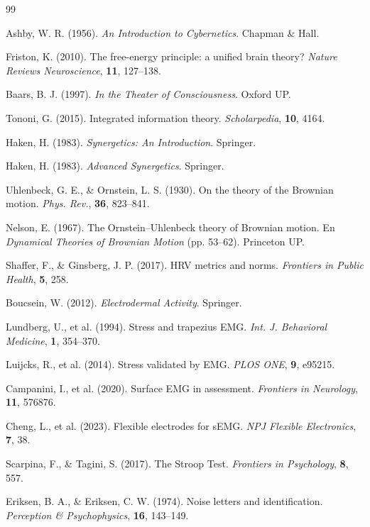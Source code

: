 \documentclass[10pt,a4paper,twocolumn]{article}
\theoremstyle{definition}
\theoremstyle{plain}
\begin{document}
\begin{thebibliography}{99}\small

Ashby, W. R. (1956). \emph{An Introduction to Cybernetics}. Chapman \& Hall.

Friston, K. (2010). The free-energy principle: a unified brain theory?
\emph{Nature Reviews Neuroscience}, \textbf{11}, 127–138.

Baars, B. J. (1997). \emph{In the Theater of Consciousness}. Oxford UP.

Tononi, G. (2015). Integrated information theory. \emph{Scholarpedia}, \textbf{10}, 4164.

Haken, H. (1983). \emph{Synergetics: An Introduction}. Springer.

Haken, H. (1983). \emph{Advanced Synergetics}. Springer.

Uhlenbeck, G. E., \& Ornstein, L. S. (1930). On the theory of the Brownian motion.
\emph{Phys. Rev.}, \textbf{36}, 823–841.

Nelson, E. (1967). The Ornstein–Uhlenbeck theory of Brownian motion.
En \emph{Dynamical Theories of Brownian Motion} (pp. 53–62). Princeton UP.

Shaffer, F., \& Ginsberg, J. P. (2017). HRV metrics and norms.
\emph{Frontiers in Public Health}, \textbf{5}, 258.

Boucsein, W. (2012). \emph{Electrodermal Activity}. Springer.

Lundberg, U., et al. (1994). Stress and trapezius EMG.
\emph{Int. J. Behavioral Medicine}, \textbf{1}, 354–370.

Luijcks, R., et al. (2014). Stress validated by EMG.
\emph{PLOS ONE}, \textbf{9}, e95215.

Campanini, I., et al. (2020). Surface EMG in assessment.
\emph{Frontiers in Neurology}, \textbf{11}, 576876.

Cheng, L., et al. (2023). Flexible electrodes for sEMG.
\emph{NPJ Flexible Electronics}, \textbf{7}, 38.

Scarpina, F., \& Tagini, S. (2017). The Stroop Test.
\emph{Frontiers in Psychology}, \textbf{8}, 557.

Eriksen, B. A., \& Eriksen, C. W. (1974). Noise letters and identification.
\emph{Perception \& Psychophysics}, \textbf{16}, 143–149.


\end{thebibliography}
\end{document}
